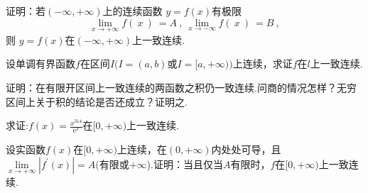 \documentclass[lang=cn,newtx,10pt,scheme=chinese]{elegantbook}
\begin{document}
\begin{problem}
证明：若$(-\infty,+\infty)$上的连续函数 $y=f(x)$有极限
$$\lim_{x\to+\infty}f(\:x\:)\:=A\:,\:\lim_{x\to-\infty}f(\:x\:)\:=B\:,$$
则 $y=f(x)$在$(-\infty,+\infty)$上一致连续.
\end{problem}

\begin{problem}
    设单调有界函数$f$在区间$I(I=(a,b)$或$I=[a,+\infty))$上连续，求证$f$在$l$上一致连续.
\end{problem}

\begin{problem}
    证明：在有限开区间上一致连续的两函数之积仍一致连续.问商的情况怎样？无穷区间上关于积的结论是否还成立？证明之.
\end{problem}

\begin{problem}
    求证:$f(x)=\frac{x^{314}}{\mathrm{e}^x}$在$[0,+\infty)$上一致连续.
\end{problem}

\begin{problem}
    设实函数$f(x)$在$[0,+\infty)$上连续，在$(0,+\infty)$内处处可导，且$\lim \limits_{x\to +\infty} |f^{\prime}(x)|=A($有限或$+\infty$).证明：当且仅当$A$有限时，$f$在$[0,+\infty)$上一致连续.
\end{problem}
\end{document}
